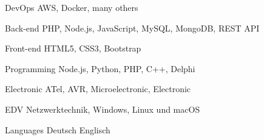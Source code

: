 

\begin{cvskills}

  \cvskill
    {DevOps} %
    {AWS, Docker, many others} %

  \cvskill
    {Back-end} %
    {PHP, Node.js, JavaScript, MySQL, MongoDB, REST API} %

  \cvskill
    {Front-end} %
    {HTML5, CSS3, Bootstrap} %

  \cvskill
    {Programming} %
    {Node.js, Python, PHP, C++, Delphi} %

  \cvskill
    {Electronic} %
    {ATel, AVR, Microelectronic, Electronic} %

  \cvskill
    {EDV} %
    {Netzwerktechnik, Windows, Linux und macOS} %
	
  \cvskill
    {Languages} %
    {Deutsch Englisch} %

\end{cvskills}
